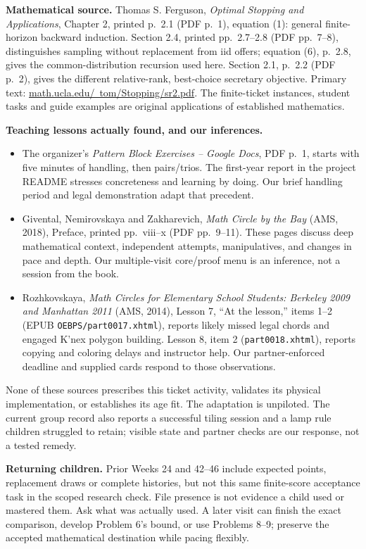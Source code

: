 \documentclass[11pt,letterpaper]{article}
\begin{document}
\textbf{Mathematical source.} Thomas S. Ferguson, \emph{Optimal Stopping and
Applications}, Chapter 2, printed p.~2.1 (PDF p.~1), equation (1): general
finite-horizon backward induction. Section 2.4, printed pp.~2.7--2.8 (PDF
pp.~7--8), distinguishes sampling without replacement from iid offers;
equation (6), p.~2.8, gives the common-distribution recursion used here.
Section 2.1, p.~2.2 (PDF p.~2), gives the different relative-rank, best-choice
secretary objective. Primary text:
\href{https://www.math.ucla.edu/~tom/Stopping/sr2.pdf}{math.ucla.edu/~tom/Stopping/sr2.pdf}.
The finite-ticket instances, student tasks and guide examples are original
applications of established mathematics.

\textbf{Teaching lessons actually found, and our inferences.}
\begin{itemize}
\item The organizer's \emph{Pattern Block Exercises -- Google Docs}, PDF p.~1,
starts with five minutes of handling, then pairs/trios. The first-year report
in the project README stresses concreteness and learning by doing.
Our brief handling period and legal demonstration adapt that precedent.
\item Givental, Nemirovskaya and Zakharevich, \emph{Math Circle by the Bay}
(AMS, 2018), Preface, printed pp.~viii--x (PDF pp.~9--11). These pages discuss
deep mathematical context, independent attempts, manipulatives, and changes
in pace and depth.
Our multiple-visit core/proof menu is an inference, not a session from the book.
\item Rozhkovskaya, \emph{Math Circles for Elementary School Students:
Berkeley 2009 and Manhattan 2011} (AMS, 2014), Lesson 7, ``At the lesson,''
items 1--2 (EPUB \texttt{OEBPS/part0017.xhtml}), reports likely missed legal
chords and engaged K'nex polygon building. Lesson 8, item 2
(\texttt{part0018.xhtml}), reports copying and coloring delays and instructor help.
Our partner-enforced deadline and supplied cards respond to those observations.
\end{itemize}
None of these sources prescribes this ticket activity, validates its physical
implementation, or establishes its age fit. The adaptation is unpiloted.
The current group record also reports a successful tiling session and a lamp
rule children struggled to retain; visible state and partner checks are our
response, not a tested remedy.

\textbf{Returning children.} Prior Weeks 24 and 42--46 include expected points,
replacement draws or complete histories, but not this same finite-score
acceptance task in the scoped research check. File presence is not evidence a
child used or mastered them. Ask what was actually used. A later visit can
finish the exact comparison, develop Problem 6's bound, or use Problems 8--9;
preserve the accepted mathematical destination while pacing flexibly.
\end{document}
